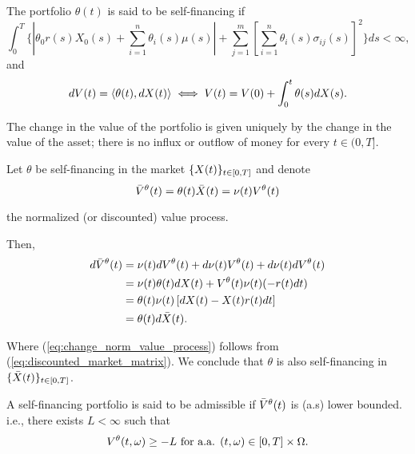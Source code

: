 \documentclass[../TGMAFFIRO.tex]{subfiles}
\begin{document}
\begin{definition}
	The portfolio $\theta(t)$ is said to be self-financing if
	\begin{equation}
	\int_0^T\{|\theta_0r(s)X_0(s) + \sum_{i=1}^{n}\theta_i(s)\mu(s)| + \sum_{j=1}^m\left[\sum_{i=1}^n\theta_i(s)\sigma_{ij}(s)\right]^2\} ds < \infty,
	\end{equation}
and 
\begin{equation}
  dV(t) = \langle \theta(t), dX(t)\rangle \iff V(t) = V(0)  + \int_0^t \theta(s) dX(s).
\end{equation}

The change in the value of the portfolio is given uniquely by the change in the value of the asset; there is no influx or outflow of money for every $t\in(0,T]$.
\end{definition}

\begin{remark}
	Let $\theta$ be self-financing in the market $\{X(t)\}_{t\in[0,T]}$ and denote
	\begin{equation}
		\bar{V}^\theta(t) = \theta(t)\bar X(t) = \nu(t) V^\theta(t)
	\end{equation}
	
the normalized (or discounted) value process.

Then,
\begin{align}
	d\bar{V}^\theta(t	) &= \nu(t) dV^\theta(t) + d\nu(t) V^\theta(t) + d\nu(t) dV^\theta(t)\nonumber\\
	&= \nu(t)\theta(t)dX(t) + V^\theta(t)\nu(t)(-r(t)dt)\nonumber\\
	&= \theta(t)\nu(t)\left[dX(t) - X(t)r(t)dt\right]\nonumber\\
	&= \theta(t)d\bar{X}(t).\label{eq:change_norm_value_process}
\end{align}

Where (\ref{eq:change_norm_value_process}) follows from (\ref{eq:discounted_market_matrix}). We conclude that $\theta$ is also self-financing in $\{\bar{X}(t)\}_{t\in[0,T]}$.
\end{remark}


\begin{definition}
	A self-financing portfolio is said to be admissible if $\bar{V}^\theta(t)$ is (a.s) lower bounded. i.e., there exists $L < \infty$ such that
	\begin{equation}
		V^\theta(t, \omega)  \geq -L \ \text{for a.a. } (t,\omega) \in [0,T]\times \Omega.
	\end{equation}
\end{definition}
\end{document}
